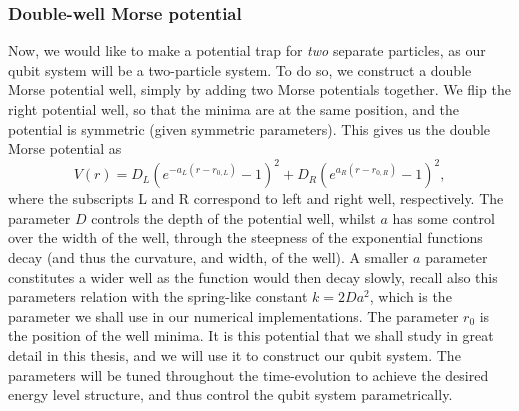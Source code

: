 \documentclass{subfiles}
\begin{document}
\subsubsection*{Double-well Morse potential}\label{sec:double_well_morse_potential}
Now, we would like to make a potential trap for \emph{two} separate particles, as our qubit system will be a two-particle system. To do so, we construct a double Morse potential well, simply by adding two Morse potentials together. We flip the right potential well, so that the minima are at the same position, and the potential is symmetric (given symmetric parameters). This gives us the double Morse potential as
\begin{equation}
    V(r) = D_L(e^{-a_L(r-r_{0,L})} - 1)^2 + D_R(e^{a_R(r-r_{0,R})} - 1)^2\label{eq:double_well_morse_potential},
\end{equation}
where the subscripts L and R correspond to left and right well, respectively. The parameter $D$ controls the depth of the potential well, whilst $a$ has some control over the width of the well, through the steepness of the exponential functions decay (and thus the curvature, and width, of the well). A smaller $a$ parameter constitutes a wider well as the function would then decay slowly, recall also this parameters relation with the spring-like constant $k=2Da^2$, which is the parameter we shall use in our numerical implementations. The parameter $r_0$ is the position of the well minima. It is this potential that we shall study in great detail in this thesis, and we will use it to construct our qubit system. The parameters will be tuned throughout the time-evolution to achieve the desired energy level structure, and thus control the qubit system parametrically.
\end{document}
